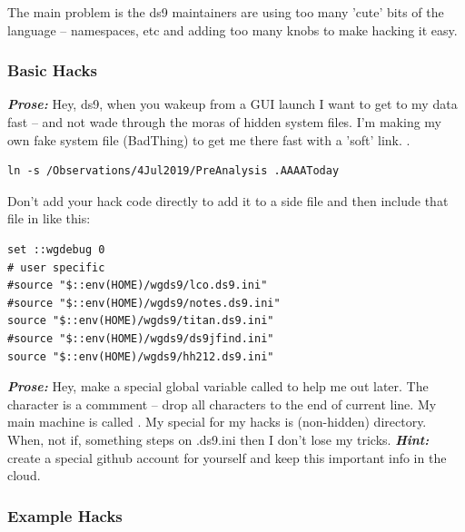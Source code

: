 The main problem is the ds9 maintainers are using too many 'cute'
bits of the language -- namespaces, etc and adding too many knobs
to make hacking it easy.

\subsubsection{Basic Hacks}

\textbf{\emph{Prose:}} Hey, ds9, when you wakeup from a GUI
launch I want to get to my data fast -- and not wade through
the moras of hidden system files. I'm making my own fake
system file (BadThing\texttrademark) to get me there fast
with a 'soft' link. .

\begingroup \fontsize{10pt}{10pt}
\selectfont
\begin{verbatim} 
ln -s /Observations/4Jul2019/PreAnalysis .AAAAToday
\end{verbatim}
\endgroup


Don't add your hack code directly to  add it to a
side file and then include that file in  like
 this:


\begingroup \fontsize{10pt}{10pt}
\selectfont
\begin{verbatim} 
set ::wgdebug 0
# user specific
#source "$::env(HOME)/wgds9/lco.ds9.ini"
#source "$::env(HOME)/wgds9/notes.ds9.ini"
source "$::env(HOME)/wgds9/titan.ds9.ini"
#source "$::env(HOME)/wgds9/ds9jfind.ini"
source "$::env(HOME)/wgds9/hh212.ds9.ini"
\end{verbatim}
\endgroup

\textbf{\emph{Prose:}} Hey, make a special global variable called
 to help me out later. The \dhl{\#} character is a
commment -- drop all characters to the end of current line. My main
machine is called . My special  for my hacks
is  (non-hidden) directory. When, not if, something steps
on .ds9.ini then I don't lose my tricks. \textbf{\emph{Hint:}} create
a special github account for yourself and keep this important info in
the cloud.

\subsubsection{Example Hacks}

